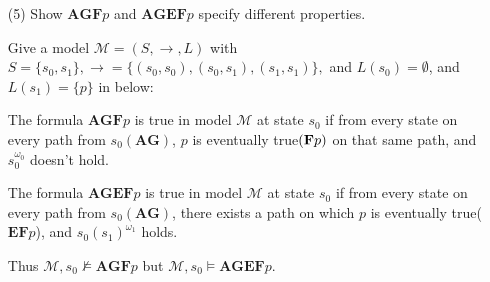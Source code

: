 \documentclass{article}
\begin{document}
\begin{enumerate}
    \newpage
    \item [(5)] Show $\textbf{AGF}p$ and $\textbf{AGEF}p$ specify different properties.

    Give a model $\mathcal M = (S, \to, L)$ with $S=\{s_0, s_1\}, \to=\{(s_0,s_0),(s_0,s_1),(s_1,s_1)\},$ and $L(s_0)=\emptyset$, and $L(s_1)=\{p\}$ in below:


    The formula $\textbf{AGF}p$ is true in model $\mathcal M$ at state $s_0$ if from every state on every path
    from $s_0(\textbf{AG})$, $p$ is eventually true$(\textbf F p)$ on that same path, and $s_0^{\omega_0}$ doesn't hold.

    The formula $\textbf{AGEF}p$ is true in model $\mathcal M$ at state $s_0$ if from every state on every path from $s_0(\textbf{AG})$, there exists a path on which $p$ is eventually true($\textbf{EF}p$), and $s_0(s_1)^{\omega_1}$ holds.    

    Thus $\mathcal M, s_0\nvDash\textbf{AGF}p$ but $\mathcal M, s_0\vDash\textbf{AGEF}p$. 

\end{enumerate}
\end{document}
